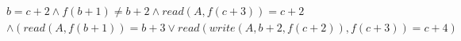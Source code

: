 \begin{align*}
%
& %
b = c + 2
%
\land
%
f(b + 1)  \neq  b + 2
%
\land
%
\mathit{read}(A,f(c + 3)) = c + 2
~\\~
& %
%
\land
%
(\mathit{read}(A,f(b + 1)) = b + 3 \lor \mathit{read}(\mathit{write}(A,b + 2,f(c + 2)),f(c + 3)) = c + 4)
%
\end{align*}

